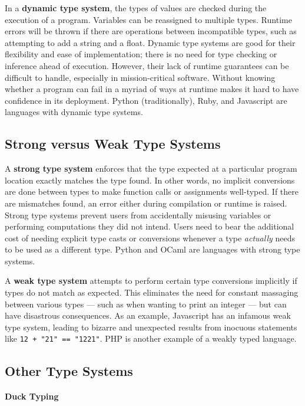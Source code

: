 \documentclass{report}
\begin{document}
In a \textbf{dynamic type system}, the types of values are checked during the execution of a program. Variables can be reassigned to multiple types. Runtime errors will be thrown if there are operations between incompatible types, such as attempting to add a string and a float. Dynamic type systems are good for their flexibility and ease of implementation; there is no need for type checking or inference ahead of execution. However, their lack of runtime guarantees can be difficult to handle, especially in mission-critical software. Without knowing whether a program can fail in a myriad of ways at runtime makes it hard to have confidence in its deployment. Python (traditionally), Ruby, and Javascript are languages with dynamic type systems.

\subsection{Strong versus Weak Type Systems}

A \textbf{strong type system} enforces that the type expected at a particular program location exactly matches the type found. In other words, no implicit conversions are done between types to make function calls or assignments well-typed. If there are mismatches found, an error either during compilation or runtime is raised. Strong type systems prevent users from accidentally misusing variables or performing computations they did not intend. Users need to bear the additional cost of needing explicit type casts or conversions whenever a type \textit{actually} needs to be used as a different type. Python and OCaml are languages with strong type systems.

A \textbf{weak type system} attempts to perform certain type conversions implicitly if types do not match as expected. This eliminates the need for constant massaging between various types --- such as when wanting to print an integer --- but can have disastrous consequences. As an example, Javascript has an infamous weak type system, leading to bizarre and unexpected results from inocuous statements like \texttt{12 + "21" == "1221"}. PHP is another example of a weakly typed language.

\subsection{Other Type Systems}
\paragraph{Duck Typing}
\end{document}
